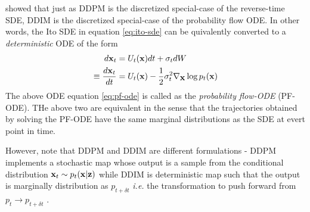 \documentclass[a4paper, 11pt]{article}
\begin{document}
\cite{song2020score} showed that just as DDPM is the discretized special-case of the reverse-time SDE, DDIM is the discretized special-case of the probability flow ODE. In other words, the Ito SDE in equation \eqref{eq:ito-sde} can be quivalently converted to a \emph{deterministic} ODE of the form 
\begin{align}
    d\mbox{$\mbox{$\mathbf{x}$}$}_t &= U_t(\mbox{$\mbox{$\mathbf{x}$}$})dt + \sigma_t dW \\
    \equiv \frac{d\mbox{$\mbox{$\mathbf{x}$}$}_t}{dt} &= U_t(\mbox{$\mbox{$\mathbf{x}$}$}) - \frac{1}{2} \sigma_t^2 \nabla_{\mbox{$\mbox{$\mathbf{x}$}$}} \log p_t(\mbox{$\mbox{$\mathbf{x}$}$}) \label{eq:pf-ode}
\end{align}
The above ODE equation \eqref{eq:pf-ode} is called as the \emph{probability flow-ODE} (PF-ODE). THe above two are equivalent in the sense that the trajectories obtained by solving the PF-ODE have the same marginal distributions as the SDE at evert point in time.


However, note that DDPM and DDIM are different formulations - DDPM implements a stochastic map  whose output is a sample from the conditional distribution $\mbox{$\mbox{$\mathbf{x}$}$}_t \sim p_t(\mbox{$\mbox{$\mathbf{x}$}$} | \mbox{$\mbox{$\mathbf{z}$}$})$ while DDIM is deterministic map such that the output is marginally distribution as $p_{t + \delta t}$ \textit{i.e.} the transformation to push forward from $p_t \to p_{t + \delta t}$ \citep{nakkiran2024step}.

\begin{center}
\end{center}
\end{document}
